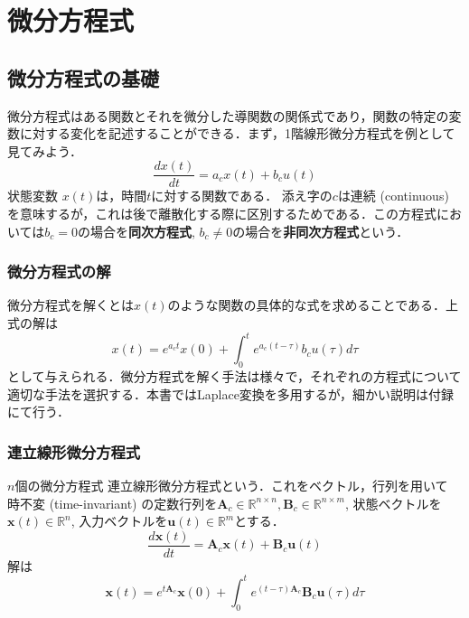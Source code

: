 \section{微分方程式}\subsection{微分方程式の基礎}微分方程式はある関数とそれを微分した導関数の関係式であり，関数の特定の変数に対する変化を記述することができる．まず，1階線形微分方程式を例として見てみよう．
$$
\frac{dx(t)}{dt}=a_c x(t)+b_c u(t)
$$
状態変数 $x(t)$は，時間$t$に対する関数である．
添え字の$c$は連続 (continuous) を意味するが，これは後で離散化する際に区別するためである．この方程式においては$b_c=0$の場合を\textbf{同次方程式}, $b_c\neq 0$の場合を\textbf{非同次方程式}という．
\subsubsection{微分方程式の解}微分方程式を解くとは$x(t)$のような関数の具体的な式を求めることである．上式の解は
$$
x(t)=e^{a_c t}x(0)+\int_0^t e^{a_c (t-\tau)}b_c u(\tau) d\tau
$$
として与えられる．微分方程式を解く手法は様々で，それぞれの方程式について適切な手法を選択する．本書ではLaplace変換を多用するが，細かい説明は付録にて行う．
\subsubsection{連立線形微分方程式}$n$個の微分方程式
連立線形微分方程式という．これをベクトル，行列を用いて
時不変 (time-invariant) の定数行列を$\mathbf{A}_c \in \mathbb{R}^{n\times n}, \mathbf{B}_c \in \mathbb{R}^{n\times m}$, 状態ベクトルを$\mathbf{x}(t)\in\mathbb{R}^n$, 入力ベクトルを$\mathbf{u}(t)\in\mathbb{R}^m$とする．
$$
\frac{d\mathbf{x}(t)}{dt} = \mathbf{A}_c\mathbf{x}(t) + \mathbf{B}_c\mathbf{u}(t)
$$
解は
$$
\mathbf{x}(t)=e^{t\mathbf{A}_c}\mathbf{x}(0)+\int_0^t e^{(t-\tau)\mathbf{A}_c}\mathbf{B}_c\mathbf{u}(\tau) d\tau
$$